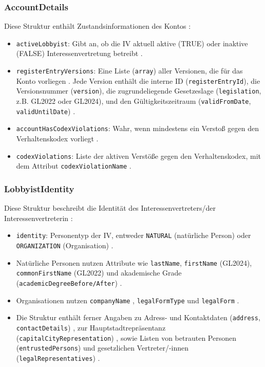 \documentclass[12pt,twoside=false,a4paper,parskip]{scrbook}
\begin{document}
\subsubsection{AccountDetails}
Diese Struktur enthält Zustandsinformationen des Kontos :
\begin{itemize}
    \item \texttt{activeLobbyist}: Gibt an, ob die IV aktuell aktive (TRUE) oder inaktive (FALSE) Interessenvertretung betreibt .
    \item \texttt{registerEntryVersions}: Eine Liste (\texttt{array}) aller Versionen, die für das Konto vorliegen . Jede Version enthält die interne ID (\texttt{registerEntryId}), die Versionsnummer (\texttt{version}), die zugrundeliegende Gesetzeslage (\texttt{legislation}, z.B. GL2022 oder GL2024), und den Gültigkeitszeitraum (\texttt{validFromDate}, \texttt{validUntilDate}) .
    \item \texttt{accountHasCodexViolations}: Wahr, wenn mindestens ein Verstoß gegen den Verhaltenskodex vorliegt .
    \item \texttt{codexViolations}: Liste der aktiven Verstöße gegen den Verhaltenskodex, mit dem Attribut \texttt{codexViolationName} .
\end{itemize}

\subsubsection{LobbyistIdentity}
Diese Struktur beschreibt die Identität des Interessenvertreters/der Interessenvertreterin :
\begin{itemize}
    \item \texttt{identity}: Personentyp der IV, entweder \texttt{NATURAL} (natürliche Person) oder \texttt{ORGANIZATION} (Organisation) .
    \item Natürliche Personen nutzen Attribute wie \texttt{lastName}, \texttt{firstName} (GL2024), \texttt{commonFirstName} (GL2022) und akademische Grade (\texttt{academicDegreeBefore/After}) .
    \item Organisationen nutzen \texttt{companyName} , \texttt{legalFormType} und \texttt{legalForm} .
    \item Die Struktur enthält ferner Angaben zu Adress- und Kontaktdaten (\texttt{address}, \texttt{contactDetails}) , zur Hauptstadtrepräsentanz (\texttt{capitalCityRepresentation}) , sowie Listen von betrauten Personen (\texttt{entrustedPersons})  und gesetzlichen Vertreter/-innen (\texttt{legalRepresentatives}) .
\end{itemize}
\end{document}
